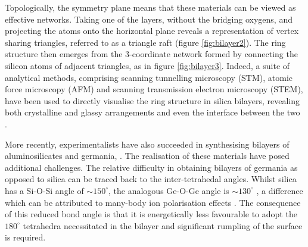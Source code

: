 Topologically, the symmetry plane means that these materials can be viewed as effective \td{} networks.
Taking one of the layers, without the bridging oxygens, and projecting the atoms onto the horizontal plane reveals a representation of vertex sharing triangles, referred to as a triangle raft (figure \ref{fig:bilayer2}).
The ring structure then emerges from the 3\--coordinate network formed by connecting the silicon atoms of adjacent triangles, as in figure \ref{fig:bilayer3}.
Indeed, a suite of analytical methods, comprising scanning tunnelling microscopy (STM), atomic force microscopy (AFM) and scanning transmission electron microscopy (STEM), have been used to directly visualise the ring structure in silica bilayers, revealing both crystalline and glassy arrangements and even the interface between the two   \cite{Loffler2010,Lichtenstein2012b}.

More recently, experimentalists have also succeeded in synthesising bilayers of aluminosilicates and germania, \geoii{} \cite{Jhang2017,Lewandowski2018,Lewandowski2019}.
The realisation of these materials have posed additional challenges.
The relative difficulty in obtaining bilayers of germania as opposed to silica can be traced back to the inter\--tetrahedal angles.
Whilst silica has a Si\--O\--Si angle of $\sim 150^\circ$, the analogous Ge\--O\--Ge angle is $\sim 130^\circ$ \cite{Neuefeind1996}, a difference which can be attributed to many\--body ion polarisation effects \cite{Wilson2012a,Wilson2012b}.
The consequence of this reduced bond angle is that it is energetically less favourable to adopt the $180^\circ$ tetrahedra necessitated in the bilayer and significant rumpling of the surface is required.

